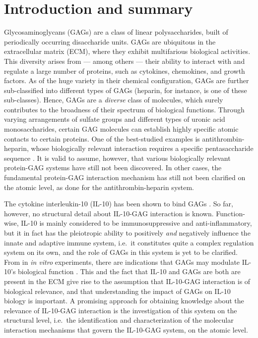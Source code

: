 \chapter{Introduction and summary}



Glycosaminoglycans (GAGs) are a class of linear polysaccharides, built of
periodically occurring disaccharide units. GAGs are ubiquitous in the
extracellular matrix (ECM), where they exhibit multifarious biological
activities. This diversity arises from --- among others --- their ability to
interact with and regulate a large number of proteins, such as cytokines,
chemokines, and growth factors. As of the huge variety in their chemical
configuration, GAGs are further sub-classified into different types of GAGs
(heparin, for instance, is one of these sub-classes). Hence, GAGs are a
\textit{diverse} class of molecules, which surely contributes to the broadness
of their spectrum of biological functions. Through varying arrangements of
sulfate groups and different types of uronic acid monosaccharides, certain GAG
molecules can establish highly specific atomic contacts to certain proteins. One
of the best-studied examples is antithrombin-heparin, whose biologically
relevant interaction requires a specific pentasaccharide sequence
\cite{antithrombin-thrombin-heparin-2004}. It is valid to assume, however, that
various biologically relevant protein-GAG systems have still not been
discovered. In other cases, the fundamental protein-GAG interaction mechanism
has still not been clarified on the atomic level, as done for the
antithrombin-heparin system.

The cytokine interleukin-10 (IL-10) has been shown to bind GAGs
\cite{salek_ardakani_2000}. So far, however, no structural detail about
IL-10-GAG interaction is known. Function-wise, IL-10 is mainly considered to be
immunosuppressive and anti-inflammatory, but it in fact has the pleiotropic
ability to positively \textit{and} negatively influence the innate and adaptive
immune system, i.e.\ it constitutes quite a complex regulation system on its
own, and the role of GAGs in this system is yet to be clarified. From in
\textit{in vitro} experiments, there are indications that GAGs may modulate
IL-10's biological function \cite{salek_ardakani_2000}. This and the fact that
IL-10 and GAGs are both are present in the ECM give rise to the assumption that
IL-10-GAG interaction is of biological relevance, and that understanding the
impact of GAGs on IL-10 biology is important. A promising approach for obtaining
knowledge about the relevance of IL-10-GAG interaction is the investigation of
this system on the structural level, i.e.\ the identification and
characterization of the molecular interaction mechanisms that govern the
IL-10-GAG system, on the atomic level.

